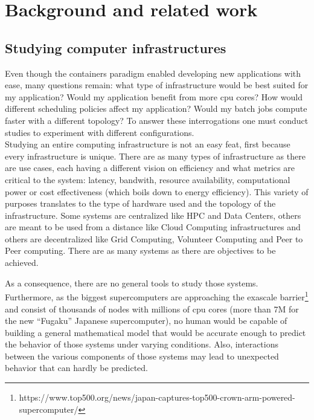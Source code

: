 \chapter{Background and related work}


\section{Studying computer infrastructures} \label{study-computing-infra}

Even though the containers paradigm enabled developing new applications with
ease, many questions remain: what type of infrastructure would be best suited
for my application? Would my application benefit from more cpu cores? How would
different scheduling policies affect my application? Would my batch jobs
compute faster with a different topology? To answer these interrogations one
must conduct studies to experiment with different configurations.\\

Studying an entire computing infrastructure is not an easy feat, first because
every infrastructure is unique. There are as many types of infrastructure as
there are use cases, each having a different vision on efficiency and what
metrics are critical to the system: latency, bandwith, resource availability,
computational power or cost effectiveness (which boils down to energy
efficiency). This variety of purposes translates to the type of hardware used
and the topology of the infrastructure. Some systems are centralized like HPC
and Data Centers, others are meant to be used from a distance like Cloud
Computing infrastructures and others are decentralized like Grid Computing,
Volunteer Computing and Peer to Peer computing. There are as many systems as
there are objectives to be achieved.

As a consequence, there are no general tools to study those systems.
Furthermore, as the biggest supercomputers are approaching the exascale
barrier\footnote{https://www.top500.org/news/japan-captures-top500-crown-arm-powered-supercomputer/}
and consist of thousands of nodes with millions of cpu cores (more than 7M for
the new ``Fugaku'' Japanese supercomputer), no human would be capable of
building a general mathematical model that would be accurate enough to predict
the behavior of those systems under varying conditions. Also, interactions
between the various components of those systems may lead to unexpected
behavior\cite{10.1007/978-3-319-09873-9_12} that can hardly be predicted.

